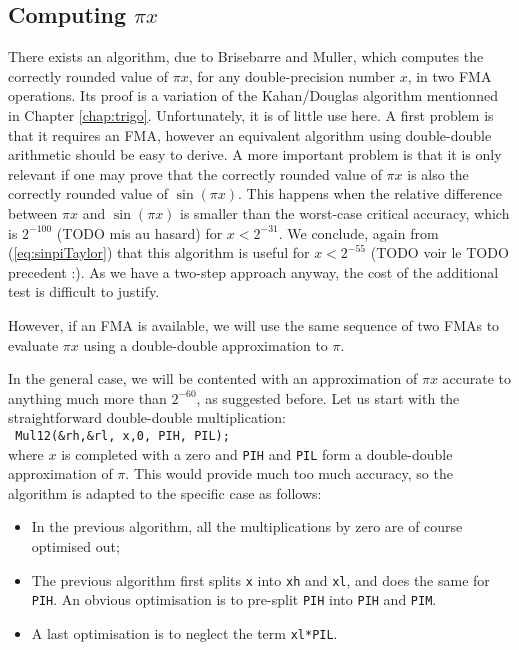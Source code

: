 \subsection{Computing $\pi x$}

There exists an algorithm, due to Brisebarre and Muller, which
computes the correctly rounded value of $\pi x$, for any
double-precision number $x$, in two FMA operations.  Its proof is a
variation of the Kahan/Douglas algorithm mentionned in Chapter
\ref{chap:trigo}. Unfortunately, it is of little use here. A first
problem is that it requires an FMA, however an equivalent algorithm
using double-double arithmetic should be easy to derive. A more
important problem is that it is only relevant if one may prove that
the correctly rounded value of $\pi x$ is also the correctly rounded
value of $\sin(\pi x)$. This happens when the relative difference
between $\pi x$ and $\sin(\pi x)$ is smaller than the worst-case
critical accuracy, which is $2^{-100}$ (TODO mis au hasard) for
$x<2^{-31}$. We conclude, again from (\ref{eq:sinpiTaylor}) that this
algorithm is useful for $x<2^{-55}$ (TODO voir le TODO precedent :).
As we have a two-step approach anyway, the cost of the additional test
is difficult to justify. 

However, if an FMA is available, we will use the same sequence of two
FMAs to evaluate $\pi x$ using  a double-double
approximation to $\pi$.

In the general case, we will be contented with an approximation of
$\pi x$ accurate to anything much more than $2^{-60}$, as suggested
before. Let us start with the straightforward double-double multiplication:\\
\texttt{ Mul12(&rh,&rl, x,0, PIH, PIL);}\\
where $x$ is completed with a zero and \texttt{PIH} and \texttt{PIL}
form a double-double approximation of $\pi$. This would provide much
too much accuracy, so the algorithm is adapted to the specific case as
follows:
\begin{itemize}
\item In the previous algorithm, all the multiplications by zero are of course optimised out;
\item The previous algorithm first splits \texttt{x} into \texttt{xh}
  and \texttt{xl}, and does the same for \texttt{PIH}. An obvious
  optimisation is to pre-split \texttt{PIH} into \texttt{PIH} and
  \texttt{PIM}.
\item A last optimisation is to neglect the term \texttt{xl*PIL}.
\end{itemize}

